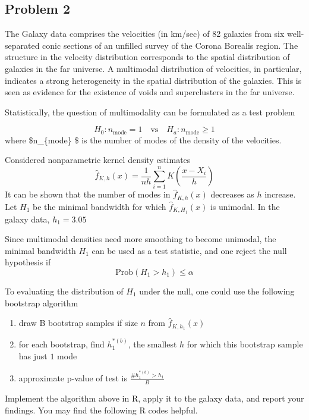 \documentclass[
]{article}
\begin{document}
\hypertarget{problem-2}{%
\subsection{Problem 2}\label{problem-2}}

The Galaxy data comprises the velocities (in km/sec) of 82 galaxies from
six well-separated conic sections of an unfilled survey of the Corona
Borealis region. The structure in the velocity distribution corresponds
to the spatial distribution of galaxies in the far universe. A
multimodal distribution of velocities, in particular, indicates a strong
heterogeneity in the spatial distribution of the galaxies. This is seen
as evidence for the existence of voids and superclusters in the far
universe.

Statistically, the question of multimodality can be formulated as a test
problem

\[H_0: n_{\mbox{mode}} = 1 \quad \mbox{vs} \quad H_a: n_{\mbox{mode}} \ge 1\]
where \$n\_\{\mbox{mode}\} \$ is the number of modes of the density of
the velocities.

Considered nonparametric kernel density estimates
\[ \widehat{f}_{K,h}(x) = \frac{1}{nh}\sum_{i=1}^n K(\frac{x - X_i}{h}) \]
It can be shown that the number of modes in \(\widehat{f}_{K,h}(x)\)
decreases as \(h\) increase. Let \(H_1\) be the minimal bandwidth for
which \(\widehat{f}_{K,H_1}(x)\) is unimodal. In the galaxy data,
\(h_1 = 3.05\)

Since multimodal densities need more smoothing to become unimodal, the
minimal bandwidth \(H_1\) can be used as a test statistic, and one
reject the null hypothesis if \[\mbox{Prob} (H_1 > h_1) \le \alpha \]

To evaluating the distribution of \(H_1\) under the null, one could use
the following bootstrap algorithm

\begin{enumerate}
\item draw B bootstrap samples if size $n$ from  $\widehat{f}_{K,h_1}(x)$
\item for each bootstrap, find $h_1^{*(b)}$, the smallest $h$ for which this bootstrap sample has just $1$ mode
\item approximate p-value of test is $\frac{\#{h_1^{*(b)}>h_1}}{B}$
\end{enumerate}

Implement the algorithm above in R, apply it to the galaxy data, and
report your findings. You may find the following R codes helpful.
\end{document}
